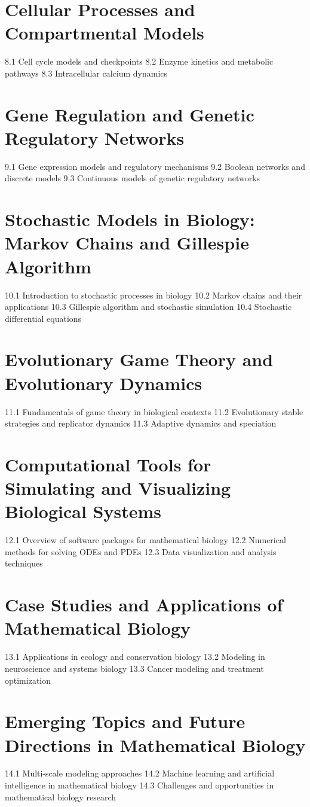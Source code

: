 \section{Cellular Processes and Compartmental Models}
8.1 Cell cycle models and checkpoints
8.2 Enzyme kinetics and metabolic pathways
8.3 Intracellular calcium dynamics
\section{Gene Regulation and Genetic Regulatory Networks}
9.1 Gene expression models and regulatory mechanisms
9.2 Boolean networks and discrete models
9.3 Continuous models of genetic regulatory networks
\section{Stochastic Models in Biology: Markov Chains and Gillespie Algorithm}
10.1 Introduction to stochastic processes in biology
10.2 Markov chains and their applications
10.3 Gillespie algorithm and stochastic simulation
10.4 Stochastic differential equations
\section{Evolutionary Game Theory and Evolutionary Dynamics}
11.1 Fundamentals of game theory in biological contexts
11.2 Evolutionary stable strategies and replicator dynamics
11.3 Adaptive dynamics and speciation
\section{Computational Tools for Simulating and Visualizing Biological Systems}
12.1 Overview of software packages for mathematical biology
12.2 Numerical methods for solving ODEs and PDEs
12.3 Data visualization and analysis techniques
\section{Case Studies and Applications of Mathematical Biology}
13.1 Applications in ecology and conservation biology
13.2 Modeling in neuroscience and systems biology
13.3 Cancer modeling and treatment optimization
\section{Emerging Topics and Future Directions in Mathematical Biology}
14.1 Multi-scale modeling approaches
14.2 Machine learning and artificial intelligence in mathematical biology
14.3 Challenges and opportunities in mathematical biology research
